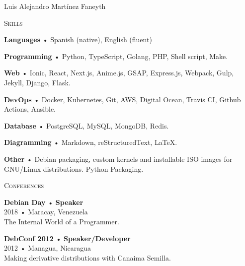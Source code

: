 \documentclass[12pt]{article}
\begin{document}
\begin{cv}{Luis Alejandro Mart\'inez Faneyth}
\begin{minipage}[t]{0.35\textwidth}
    \vspace{0.25em}
    \begin{minipage}{\linewidth}
      \textrm{\textsc{\Large{Skills}}}
      \newline
      \parbox[t]{\linewidth}{
        \textbf{Languages} • \footnotesize{Spanish (native), English (fluent)}
      }
      \parbox[t]{\linewidth}{
        \textbf{Programming} • \footnotesize{Python, TypeScript, Golang, PHP, Shell script, Make.}
      }
      \parbox[t]{\linewidth}{
        \textbf{Web} • \footnotesize{Ionic, React, Next.js, Anime.js, GSAP, Express.js, Webpack, Gulp, Jekyll, Django, Flask.}
      }
      \parbox[t]{\linewidth}{
        \textbf{DevOps} • \footnotesize{Docker, Kubernetes, Git, AWS, Digital Ocean, Travis CI, Github Actions, Ansible.}
      }
      \parbox[t]{\linewidth}{
        \textbf{Database} • \footnotesize{PostgreSQL, MySQL, MongoDB, Redis.}
      }
      \parbox[t]{\linewidth}{
        \textbf{Diagramming} • \footnotesize{Markdown, reStructuredText, \LaTeX.}
      }
      \parbox[t]{\linewidth}{
        \textbf{Other} • \footnotesize{Debian packaging, custom kernels and installable ISO images for GNU/Linux distributions. Python Packaging.}
      }
      \newline
      \newline
    \end{minipage}

    \vspace{0.25em}
    \begin{minipage}{\linewidth}
      \textrm{\textsc{\Large{Conferences}}}
      \newline
      \parbox[t]{\linewidth}{
        \textbf{Debian Day} • \textrm{\textbf{Speaker}}\\
        2018 • Maracay, Venezuela\\
        \footnotesize{The Internal World of a Programmer.}\\
      }
      \newline
      \parbox[t]{\linewidth}{
        \textbf{DebConf 2012} • \textrm{\textbf{Speaker/Developer}}\\
        2012 • Managua, Nicaragua\\
        \footnotesize{Making derivative distributions with Canaima Semilla.}\\
      }
      \newline
    \end{minipage}


\end{minipage}
\end{cv}
\end{document}
